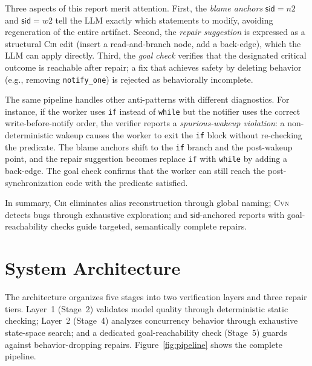 \documentclass[sigconf]{acmart}
\begin{document}
Three aspects of this report merit attention. First, the \emph{blame anchors} $\mathsf{sid}{=}n2$ and $\mathsf{sid}{=}w2$ tell the LLM exactly which statements to modify, avoiding regeneration of the entire artifact. Second, the \emph{repair suggestion} is expressed as a structural \textsc{Cir} edit (insert a read-and-branch node, add a back-edge), which the LLM can apply directly. Third, the \emph{goal check} verifies that the designated critical outcome is reachable after repair; a fix that achieves safety by deleting behavior (e.g., removing \texttt{notify\_one}) is rejected as behaviorally incomplete.

The same pipeline handles other anti-patterns with different diagnostics. For instance, if the worker uses \texttt{if} instead of \texttt{while} but the notifier uses the correct write-before-notify order, the verifier reports a \emph{spurious-wakeup violation}: a
non-deterministic wakeup causes the worker to exit the \texttt{if} block without re-checking the predicate. The blame anchors shift to the \texttt{if} branch and the post-wakeup point, and the repair suggestion becomes replace \texttt{if} with \texttt{while} by adding a back-edge. The goal check confirms that the worker can still reach the post-synchronization code with the predicate satisfied.

\medskip
\noindent
In summary, \textsc{Cir} eliminates alias reconstruction through global naming; \textsc{Cvn} detects bugs through exhaustive exploration; and $\mathsf{sid}$-anchored reports with goal-reachability checks guide targeted, semantically complete repairs.

\section{System Architecture}
\label{sec:architecture}

The architecture organizes five stages into two verification layers and three repair tiers.
Layer~1 (Stage~2) validates model quality through deterministic static checking; Layer~2 (Stage~4) analyzes concurrency behavior through exhaustive state-space search; and a dedicated
goal-reachability check (Stage~5) guards against behavior-dropping repairs. Figure~\ref{fig:pipeline} shows the complete pipeline.
\end{document}
